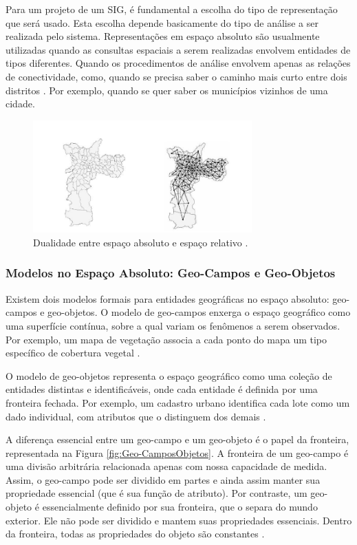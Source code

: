Para um projeto de um SIG, é fundamental a escolha do tipo de representação que será usado. Esta escolha depende basicamente do tipo de análise a ser realizada pelo sistema. Representações em espaço absoluto são usualmente utilizadas quando as consultas espaciais a serem realizadas envolvem entidades de tipos diferentes. Quando os procedimentos de análise envolvem apenas as relações de conectividade, como, quando se precisa saber o caminho mais curto entre dois distritos \cite{queirozferreira}. Por exemplo, quando se quer saber os municípios vizinhos de uma cidade.

\newpage

\begin{figure}[h]
\centering
\includegraphics[width=0.75\textwidth]{./img/cap_II/3-AbsolutoRelativo}
\caption{Dualidade entre espaço absoluto e espaço relativo \cite{queirozferreira}.}
\label{fig:AbsolutoRelativo}
\end{figure}

\subsubsection{Modelos no Espaço Absoluto: Geo-Campos e Geo-Objetos}

Existem dois modelos formais para entidades geográficas no espaço absoluto: geo-campos e geo-objetos. O modelo de geo-campos enxerga o espaço geográfico como uma superfície contínua, sobre a qual variam os fenômenos a serem observados. Por exemplo, um mapa de vegetação associa a cada ponto do mapa um tipo específico de cobertura vegetal \cite{queirozferreira}.

O modelo de geo-objetos representa o espaço geográfico como uma coleção de entidades distintas e identificáveis, onde cada entidade é definida por uma fronteira fechada. Por exemplo, um cadastro urbano identifica cada lote como um dado individual, com atributos que o distinguem dos demais \cite{queirozferreira}.

A diferença essencial entre um geo-campo e um geo-objeto é o papel da fronteira, representada na Figura \ref{fig:Geo-CamposObjetos}. A fronteira de um geo-campo é uma divisão arbitrária relacionada apenas com nossa capacidade de medida. Assim, o geo-campo pode ser dividido em partes e ainda assim manter sua propriedade essencial (que é sua função de atributo). Por contraste, um geo-objeto é essencialmente definido por sua fronteira, que o separa do mundo exterior. Ele não pode ser dividido e mantem suas propriedades essenciais. Dentro da fronteira, todas as propriedades do objeto são constantes \cite{queirozferreira}.

